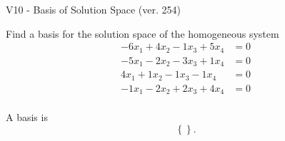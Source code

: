 \begin{exercise}
  \begin{exerciseTitle}V10 - Basis of Solution Space (ver. 254)\end{exerciseTitle}
  \begin{exerciseStatement}
    Find a basis for the solution space of the homogeneous system 
\begin{align*}
 -6 x_ 1 + 4 x_ 2 -1 x_ 3 + 5 x_ 4 &= 0  \\ 
  -5 x_ 1 -2 x_ 2 -3 x_ 3 + 1 x_ 4 &= 0  \\ 
  4 x_ 1 + 1 x_ 2 -1 x_ 3 -1 x_ 4 &= 0  \\ 
  -1 x_ 1 -2 x_ 2 + 2 x_ 3 + 4 x_ 4 &= 0  \\ 
 \end{align*}


 
  \end{exerciseStatement}

  \begin{exerciseAnswer}
   A basis is   
\[\left\{\right\}.\]

  


  \end{exerciseAnswer}
\end{exercise}